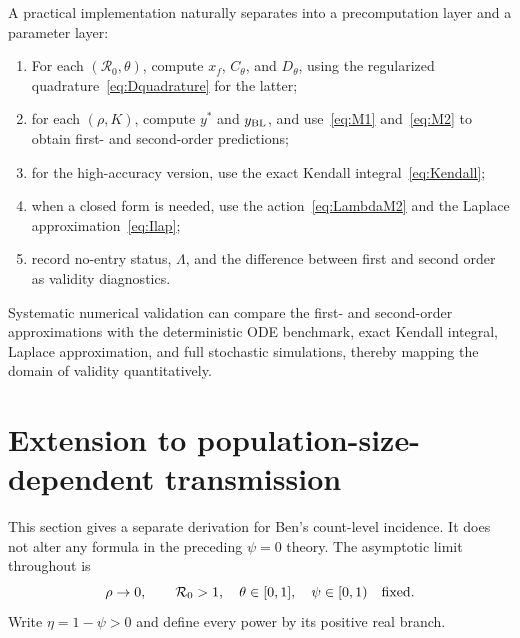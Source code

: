 \documentclass[11pt,a4paper]{article}
\newcommand{\Rzero}{\mathcal R_0}
\newcommand{\BL}{y_{\rm BL}}
\newcommand{\xf}{x_f}
\begin{document}
A practical implementation naturally separates into a precomputation layer and a parameter layer:
\begin{enumerate}
\item For each $(\Rzero,\theta)$, compute $\xf$, $C_\theta$, and $D_\theta$, using the regularized quadrature~\eqref{eq:Dquadrature} for the latter;
\item for each $(\rho,K)$, compute $y^*$ and $\BL$, and use~\eqref{eq:M1} and~\eqref{eq:M2} to obtain first- and second-order predictions;
\item for the high-accuracy version, use the exact Kendall integral~\eqref{eq:Kendall};
\item when a closed form is needed, use the action~\eqref{eq:LambdaM2} and the Laplace approximation~\eqref{eq:Ilap};
\item record no-entry status, $\Lambda$, and the difference between first and second order as validity diagnostics.
\end{enumerate}

Systematic numerical validation can compare the first- and second-order
approximations with the deterministic ODE benchmark, exact Kendall integral,
Laplace approximation, and full stochastic simulations, thereby mapping the
domain of validity quantitatively.

\section{Extension to population-size-dependent transmission}
\label{sec:psi-extension}

This section gives a separate derivation for Ben's count-level incidence.  It
does not alter any formula in the preceding $\psi=0$ theory.  The asymptotic
limit throughout is
\[
 \rho\to0,\qquad \Rzero>1,\quad \theta\in[0,1],\quad
 \psi\in[0,1)\quad\hbox{fixed}.
\]
Write $\eta=1-\psi>0$ and define every power by its positive real branch.
\end{document}
